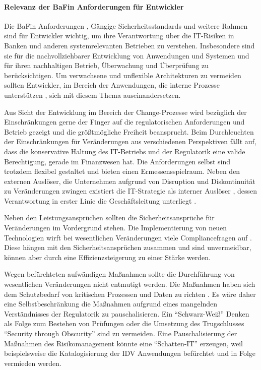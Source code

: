 \paragraph{Relevanz der BaFin Anforderungen für Entwickler}
Die BaFin Anforderungen \cite{MaRisk:2017, BAIT:2018}, Gängige Sicherheitsstandards \cite{IT-Grundschutz:2020, Disterer2013} und weitere Rahmen sind für Entwickler wichtig, um ihre Verantwortung über die IT-Risiken in Banken und anderen systemrelevanten Betrieben zu verstehen. Insbesondere sind sie für die nachvollziehbarer Entwicklung von Anwendungen und Systemen und für ihren nachhaltigen Betrieb, Überwachung und Überprüfung zu berücksichtigen. Um verwachsene und unflexible Architekturen zu vermeiden sollten Entwickler, im Bereich der Anwendungen, die interne Prozesse unterstützen \cite{Bussmann2006}, sich mit diesem Thema auseinandersetzen.

Aus Sicht der Entwicklung im Bereich der Change-Prozesse wird bezüglich der Einschränkungen gerne der Finger auf die regulatorischen Anforderungen und Betrieb gezeigt und die größtmögliche Freiheit beansprucht. Beim Durchleuchten der Einschränkungen für Veränderungen aus verschiedenen Perspektiven fällt auf, dass die konservative Haltung des IT-Betriebs und der Regulatorik eine valide Berechtigung, gerade im Finanzwesen hat. Die Anforderungen selbst sind trotzdem flexibel gestaltet und bieten einen Ermessensspielraum. Neben den externen Auslöser, die Unternehmen aufgrund von Disruption und Diskontinuität zu Veränderungen zwingen \cite{Gupta:2017, Fernandez:2020} existiert die IT-Strategie als interner Auslöser \cite{BAIT:2018, Alt2017}, dessen Verantwortung in erster Linie die Geschäftsleitung unterliegt \cite{BAIT:2018}.

Neben den Leistungsansprüchen sollten die Sicherheitsansprüche für Veränderungen im Vordergrund stehen. Die Implementierung von neuen Technologien wirft bei wesentlichen Veränderungen viele Compliancefragen auf \cite{MaRisk:2017}. Diese hängen mit den Sicherheitsansprüchen zusammen und sind unvermeidbar, können aber durch eine Effizienzsteigerung zu einer Stärke werden.

Wegen befürchteten aufwändigen Maßnahmen sollte die Durchführung von wesentlichen Veränderungen nicht entmutigt werden. Die Maßnahmen haben sich dem Schutzbedarf von kritischen Prozessen und Daten zu richten \cite{MaRisk:2017, BAIT:2018}. Es wäre daher eine Selbstbeschränkung die Maßnahmen aufgrund eines mangelnden Verständnisses der Regulatorik zu pauschalisieren. Ein \enquote{Schwarz-Weiß} Denken als Folge zum Bestehen von Prüfungen oder die Umsetzung des Trugschlusses \enquote{Security through Obscurity} sind zu vermeiden. Eine Pauschalisierung der Maßnahmen des Risikomanagement könnte eine \enquote{Schatten-IT} \cite[S. 104]{Dorschel2018} erzeugen, weil beispielsweise die Katalogisierung der \ac{IDV} Anwendungen \cite{BAIT:2018} befürchtet und in Folge vermieden werden.

